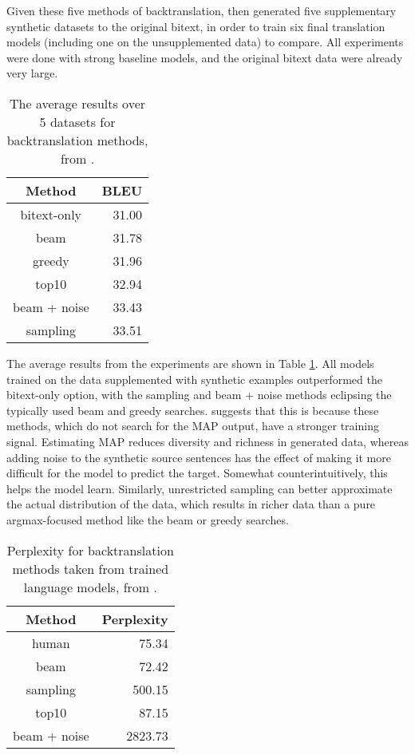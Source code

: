 Given these five methods of backtranslation, \cite{edunov2018understanding} then generated five supplementary synthetic datasets to the original bitext, in order to train six final translation models (including one on the unsupplemented data) to compare. All experiments were done with strong baseline models, and the original bitext data were already very large.

\begin{table}[h]
\centering
 \begin{tabular}{||c | r ||} 
 \hline
 Method & BLEU \\ [0.3ex] 
 \hline\hline
 bitext-only & 31.00 \\ 
 \hline
 beam & 31.78 \\ 
 \hline
 greedy & 31.96 \\ 
 \hline
 top10 & 32.94 \\ 
 \hline
 beam + noise & 33.43 \\ 
 \hline
 sampling & 33.51 \\
 \hline
\end{tabular}
\caption{The average results over 5 datasets for backtranslation methods, from \cite{edunov2018understanding}.}
\label{edunov2018results}
\end{table}

The average results from the experiments are shown in Table \ref{edunov2018results}. All models trained on the data supplemented with synthetic examples outperformed the bitext-only option, with the sampling and beam + noise methods eclipsing the typically used beam and greedy searches. \cite{edunov2018understanding} suggests that this is because these methods, which do not search for the MAP output, have a stronger training signal. Estimating MAP reduces diversity and richness in generated data, whereas adding noise to the synthetic source sentences has the effect of making it more difficult for the model to predict the target. Somewhat counterintuitively, this helps the model learn. Similarly, unrestricted sampling can better approximate the actual distribution of the data, which results in richer data than a pure argmax-focused method like the beam or greedy searches.

\begin{table}[h]
\centering
 \begin{tabular}{||c | r ||} 
 \hline
 Method & Perplexity \\ [0.3ex] 
 \hline\hline
 human & 75.34 \\ 
 \hline
 beam & 72.42 \\ 
 \hline
 sampling & 500.15 \\ 
 \hline
 top10 & 87.15 \\ 
 \hline
 beam + noise & 2823.73 \\ 
 \hline
\end{tabular}
\caption{Perplexity for backtranslation methods taken from trained language models, from \cite{edunov2018understanding}.}
\label{edunov2018perplex}
\end{table}

